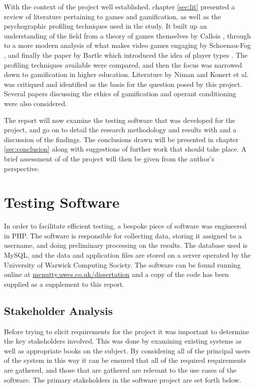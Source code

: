 \documentclass[12pt,a4paper,twoside]{report}
\begin{document}
With the context of the project well established, chapter \ref{sec:lit} presented a review of literature pertaining to games and gamification, as well as the psychographic profiling techniques used in the study. It built up an understanding of the field from a theory of games themselves by Callois \cite{caillois1961man}, through to a more modern analysis of what makes video games engaging by Schoenau-Fog \cite{schoenau2011player}, and finally the paper by Bartle which introduced the idea of player types \cite{bartle1996hearts}. The profiling techniques available were compared, and then the focus was narrowed down to gamification in higher education. Literature by Niman \cite{niman2014gamification} and Konert et al. \cite{konertmodeling} was critiqued and identified as the basis for the question posed by this project. Several papers discussing the ethics of gamification and operant conditioning were also considered.

The report will now examine the testing software that was developed for the project, and go on to detail the research methodology and results with and a discussion of the findings. The conclusions drawn will be presented in chapter \ref{sec:conclusion} along with suggestions of further work that should take place. A brief assessment of of the project will then be given from the author's perspective.

\chapter{Testing Software}
\label{sec:software}
In order to facilitate efficient testing, a bespoke piece of software was engineered in PHP. The software is responsible for collecting data, storing it assigned to a username, and doing preliminary processing on the results. The database used is MySQL, and the data and application files are stored on a server operated by the University of Warwick Computing Society. The software can be found running online at \url{mcnutty.uwcs.co.uk/dissertation} and a copy of the code has been supplied as a supplement to this report.

\section{Stakeholder Analysis}
Before trying to elicit requirements for the project it was important to determine the key stakeholders involved. This was done by examining existing systems as well as appropriate books on the subject. By considering all of the principal users of the system in this way it can be ensured that all of the required requirements are gathered, and those that are gathered are relevant to the use cases of the software. The primary stakeholders in the software project are set forth below.
\end{document}
